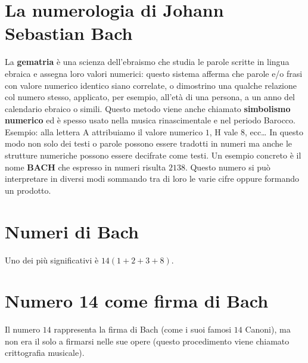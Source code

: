 \documentclass[12pt]{article}
\begin{document}
\tableofcontents
\clearpage

\section{La numerologia di Johann Sebastian Bach}
La \textbf{gematria} è una scienza dell'ebraismo che studia le parole scritte in lingua ebraica e assegna loro valori numerici: questo sistema afferma che parole e/o frasi con valore numerico identico siano
correlate, o dimostrino una qualche relazione col numero stesso, applicato, per esempio, all'età di
una persona, a un anno del calendario ebraico o simili.
Questo metodo viene anche chiamato \textbf{simbolismo numerico} ed è spesso usato nella musica
rinascimentale e nel periodo Barocco.
Esempio: alla lettera A attribuiamo il valore numerico $1$, H vale $8$, ecc…
In questo modo non solo dei testi o parole possono essere tradotti in numeri ma anche le strutture
numeriche possono essere decifrate come testi.
Un esempio concreto è il nome \textbf{BACH} che espresso in numeri risulta $2138$.
Questo numero si può interpretare in diversi modi sommando tra di loro le varie cifre oppure
formando un prodotto.

\section{Numeri di Bach}
Uno dei più significativi è $14(1+2+3+8)$.

\begin{center}
\end{center}


\section{Numero 14 come firma di Bach}
Il numero $14$ rappresenta la firma di Bach (come i suoi famosi $14$ Canoni), ma non era il solo a
firmarsi nelle sue opere (questo procedimento viene chiamato crittografia musicale).
\end{document}
